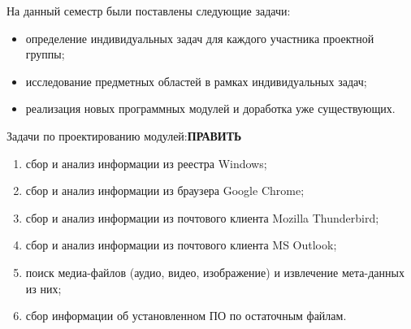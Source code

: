 На данный семестр были поставлены следующие задачи:

\begin{itemize}
\item определение индивидуальных задач для каждого участника проектной группы;
\item исследование предметных областей в рамках индивидуальных задач; 
\item реализация новых программных модулей и доработка уже существующих.
\end{itemize}

Задачи по проектированию модулей:\textbf{ПРАВИТЬ}

\begin{enumerate}
\item сбор и анализ информации из реестра Windows;
\item сбор и анализ информации из браузера Google Chrome;
\item сбор и анализ информации из почтового клиента Mozilla Thunderbird;
\item сбор и анализ информации из почтового клиента MS Outlook;
\item поиск медиа-файлов (аудио, видео, изображение) и извлечение мета-данных из них;
\item сбор информации об установленном ПО по остаточным файлам.
\end{enumerate}
